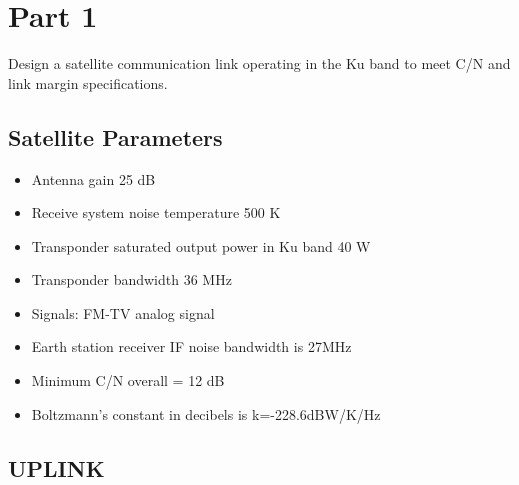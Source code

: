 \documentclass[11pt]{article}
\begin{document}


\pagebreak


\tableofcontents
\pagebreak


\section{Part 1}\label{part1}

Design a satellite communication link operating in the Ku band to meet C/N and link margin specifications.


\subsection{Satellite Parameters}\label{Satellite Parameters}

\begin{itemize}
    \item Antenna gain 25 dB
    \item Receive system noise temperature 500 K
    \item Transponder saturated output power in Ku band 40 W
    \item Transponder bandwidth 36 MHz
    \item Signals: FM-TV analog signal
    \item Earth station receiver IF noise bandwidth is 27MHz
    \item Minimum C/N overall = 12 dB
    \item Boltzmann’s constant in decibels is k=-228.6dBW/K/Hz
\end{itemize}

\subsection{UPLINK}\label{UPLINK}
\end{document}
